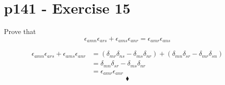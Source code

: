 \section{p141 - Exercise 15}
\begin{tcolorbox}
Prove that $$\epsilon_{amn}\epsilon_{ars}+\epsilon_{ams}\epsilon_{anr}=\epsilon_{amr}\epsilon_{ans}$$
\end{tcolorbox}
\begin{align*}
\epsilon_{amn}\epsilon_{ars}+\epsilon_{ams}\epsilon_{anr}&=
\left(\delta_{mr}\delta_{ns}-\delta_{ms}\delta_{nr}\right)
+\left(\delta_{mn}\delta_{sr}-\delta_{mr}\delta_{sn}\right)\\
&=\delta_{mn}\delta_{sr}-\delta_{ms}\delta_{nr}\\
&=\epsilon_{amr}\epsilon_{anr}
\end{align*}
$$\blacklozenge$$
\newpage